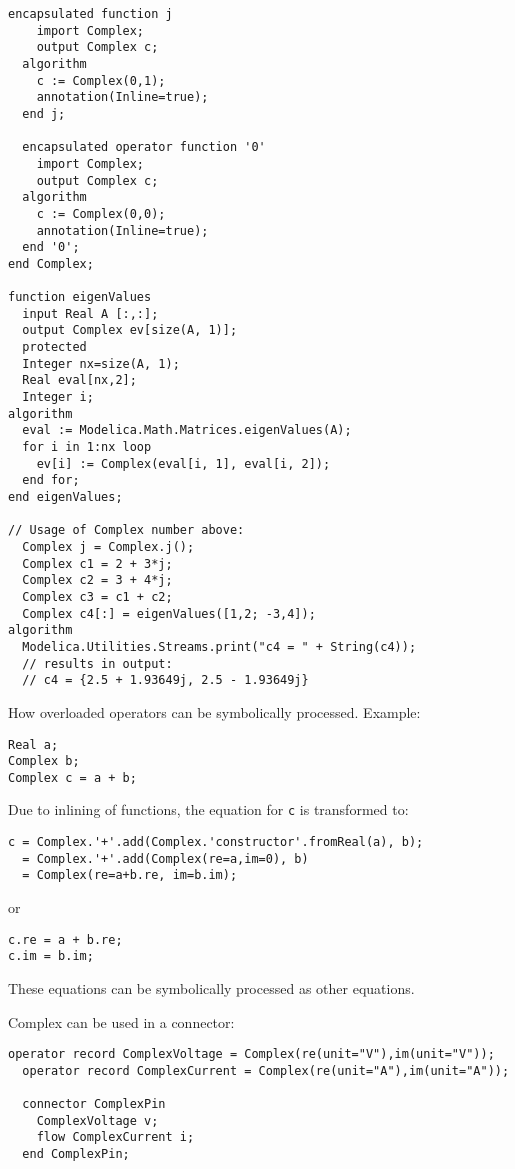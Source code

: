 \begin{example}
\begin{lstlisting}[language=modelica,escapechar=!]
  encapsulated function j
    import Complex;
    output Complex c;
  algorithm
    c := Complex(0,1);
    annotation(Inline=true);
  end j;

  encapsulated operator function '0'
    import Complex;
    output Complex c;
  algorithm
    c := Complex(0,0);
    annotation(Inline=true);
  end '0';
end Complex;

function eigenValues
  input Real A [:,:];
  output Complex ev[size(A, 1)];
  protected
  Integer nx=size(A, 1);
  Real eval[nx,2];
  Integer i;
algorithm
  eval := Modelica.Math.Matrices.eigenValues(A);
  for i in 1:nx loop
    ev[i] := Complex(eval[i, 1], eval[i, 2]);
  end for;
end eigenValues;

// Usage of Complex number above:
  Complex j = Complex.j();
  Complex c1 = 2 + 3*j;
  Complex c2 = 3 + 4*j;
  Complex c3 = c1 + c2;
  Complex c4[:] = eigenValues([1,2; -3,4]);
algorithm
  Modelica.Utilities.Streams.print("c4 = " + String(c4));
  // results in output:
  // c4 = {2.5 + 1.93649j, 2.5 - 1.93649j}
\end{lstlisting}

How overloaded operators can be symbolically processed. Example:
\begin{lstlisting}[language=modelica]
Real a;
Complex b;
Complex c = a + b;
\end{lstlisting}
Due to inlining of functions, the equation for \lstinline!c! is
transformed to:
\begin{lstlisting}[language=modelica]
c = Complex.'+'.add(Complex.'constructor'.fromReal(a), b);
  = Complex.'+'.add(Complex(re=a,im=0), b)
  = Complex(re=a+b.re, im=b.im);
\end{lstlisting}
or
\begin{lstlisting}[language=modelica]
c.re = a + b.re;
c.im = b.im;
\end{lstlisting}
These equations can be symbolically processed as other equations.

Complex can be used in a connector:
\begin{lstlisting}[language=modelica]
  operator record ComplexVoltage = Complex(re(unit="V"),im(unit="V"));
  operator record ComplexCurrent = Complex(re(unit="A"),im(unit="A"));

  connector ComplexPin
    ComplexVoltage v;
    flow ComplexCurrent i;
  end ComplexPin;


\end{lstlisting}
\end{example}
